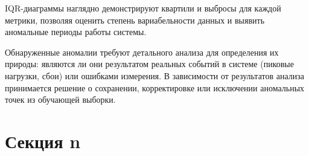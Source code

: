 \hspace*{1.25cm}IQR-диаграммы наглядно демонстрируют квартили и выбросы для каждой метрики, позволяя оценить степень вариабельности данных и выявить аномальные периоды работы системы.

\hspace*{1.25cm}Обнаруженные аномалии требуют детального анализа для определения их природы: являются ли они результатом реальных событий в системе (пиковые нагрузки, сбои) или ошибками измерения. В зависимости от результатов анализа принимается решение о сохранении, корректировке или исключении аномальных точек из обучающей выборки.

\section{Секция n}

% 
